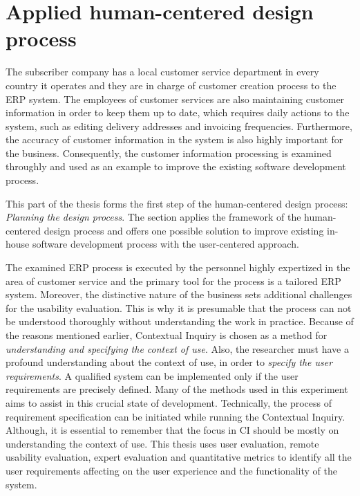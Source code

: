 \documentclass[12pt,a4paper,oneside,pdftex]{report}
\begin{document}
\section{Applied human-centered design process}
\label{sec:dprocess}

The subscriber company has a local customer service department in every country it operates and they are in charge of customer creation process to the ERP system. The employees of customer services are also maintaining customer information in order to keep them up to date, which requires daily actions to the system, such as editing delivery addresses and invoicing frequencies. Furthermore, the accuracy of customer information in the system is also highly important for the business. Consequently, the customer information processing is examined throughly and used as an example to improve the existing software development process.

This part of the thesis forms the first step of the human-centered design process: \emph{Planning the design process}. The section applies the framework of the human-centered design process and offers one possible solution to improve existing in-house software development process with the user-centered approach.

The examined ERP process is executed by the personnel highly expertized in the area of customer service and the primary tool for the process is a tailored ERP system. Moreover, the distinctive nature of the business sets additional challenges for the usability evaluation. This is why it is presumable that the process can not be understood thoroughly without understanding the work in practice. Because of the reasons mentioned earlier, Contextual Inquiry is chosen as a method for \emph{understanding and specifying the context of use}. 
Also, the researcher must have a profound understanding about the context of use, in order to \emph{specify the user requirements}. A qualified system can be implemented only if the user requirements are precisely defined. Many of the methods used in this experiment aims to assist in this crucial state of development. Technically, the process of requirement specification can be initiated while running the Contextual Inquiry. Although, it is essential to remember that the focus in CI should be mostly on understanding the context of use. This thesis uses user evaluation, remote usability evaluation, expert evaluation and quantitative metrics to identify all the user requirements affecting on the user experience and the functionality of the system. 
\end{document}
